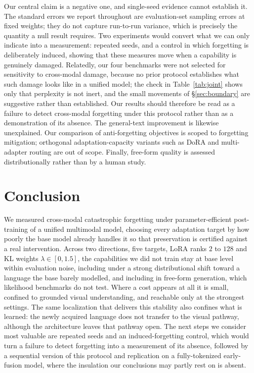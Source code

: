 \documentclass{article}
\begin{document}
Our central claim is a negative one, and single-seed evidence cannot establish
it. The standard errors we report throughout are evaluation-set sampling errors
at fixed weights; they do not capture run-to-run variance, which is precisely the
quantity a null result requires. Two experiments would convert what we can only
indicate into a measurement: repeated seeds, and a control in which forgetting is
deliberately induced, showing that these measures move when a capability is
genuinely damaged. Relatedly, our four benchmarks were not selected for
sensitivity to cross-modal damage, because no prior protocol establishes what
such damage looks like in a unified model; the check in Table~\ref{tab:joint}
shows only that perplexity is not inert, and the small movements of
\S\ref{sec:boundary} are suggestive rather than established. Our results should
therefore be read as a failure to detect cross-modal forgetting under this
protocol rather than as a demonstration of its absence. The general-text
improvement is likewise unexplained. Our comparison of anti-forgetting objectives is
scoped to forgetting mitigation; orthogonal adaptation-capacity variants such as
DoRA \citep{liu2024dora} and multi-adapter routing are out of scope. Finally,
free-form quality is assessed distributionally rather than by a human study.

\section{Conclusion}
We measured cross-modal catastrophic forgetting under parameter-efficient
post-training of a unified multimodal model, choosing every adaptation target by
how poorly the base model already handles it so that preservation is certified
against a real intervention. Across two directions, five targets, LoRA ranks $2$
to $128$ and KL weights $\lambda\in[0,1.5]$, the capabilities we did not train
stay at base level within evaluation noise, including under a strong
distributional shift toward a language the base barely modelled, and including in
free-form generation, which likelihood benchmarks do not test. Where a cost
appears at all it is small, confined to grounded visual understanding, and
reachable only at the strongest settings. The same localization that delivers
this stability also confines what is learned: the newly acquired language does
not transfer to the visual pathway, although the architecture leaves that pathway
open. The next steps we consider most valuable are repeated seeds and an
induced-forgetting control, which would turn a failure to detect forgetting into
a measurement of its absence, followed by a sequential version of this protocol
and replication on a fully-tokenized early-fusion model, where the insulation our
conclusions may partly rest on is absent.
\end{document}
